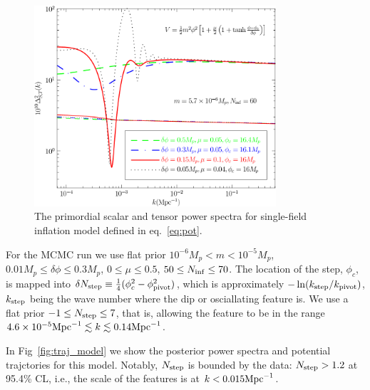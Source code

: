 \documentclass[11pt]{article}
\def \figwidth{0.8\textwidth}
\begin{document}
\begin{figure}
\centering
\includegraphics[width=\figwidth]{bumppower.pdf}
\caption{The primordial scalar and tensor power spectra for single-field inflation model defined in eq.~\eqref{eq:pot}. \label{fig:bumppower}}
\end{figure}

For the MCMC run we use flat prior $10^{-6} M_p < m < 10^{-5} M_p$, $0.01 M_p \le \delta\phi\le 0.3 M_p$, $0\le\mu\le 0.5$, $50\le N_{\rm inf} \le 70$. The location of the step, $\phi_c$, is mapped into $\delta N_{\rm step} \equiv \frac{1}{4}(\phi_c^2 - \phi_{\rm pivot}^2)$, which is approximately $ - \ln (k_{\rm step}/k_{\rm pivot})$, $k_{\rm step}$ being the wave number where the dip or osciallating feature is. We use a flat prior $-1 \le N_{\rm step} \le 7$, that is, allowing the feature to be in the range $4.6\times 10^{-5} {\rm Mpc}^{-1} \lesssim k \lesssim 0.14 {\rm Mpc}^{-1}$.

In Fig~\ref{fig:traj_model} we show the posterior power spectra and potential trajctories for this model. Notably, $N_{\rm step}$ is bounded by the data: $N_{\rm step} > 1.2$ at 95.4\% CL, i.e., the scale of the features is at $k<0.015 {\rm Mpc}^{-1}$. 
\end{document}
